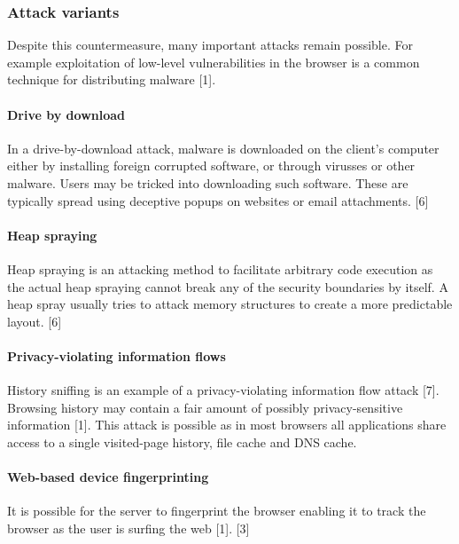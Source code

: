 \subsubsection{Attack variants}

Despite this countermeasure, many important attacks remain possible. For example exploitation of low-level vulnerabilities in the browser is a common technique for distributing malware [1].


\paragraph{Drive by download}

In a drive-by-download attack, malware is downloaded on the client's computer either by installing foreign corrupted software, or through virusses or other malware. Users may be tricked into downloading such software. These are typically spread using deceptive popups on websites or email attachments. [6]


\paragraph{Heap spraying}

Heap spraying is an attacking method to facilitate arbitrary code execution as the actual heap spraying cannot break any of the security boundaries by itself. A heap spray usually tries to attack memory structures to create a more predictable layout. [6]


\paragraph{Privacy-violating information flows}

History sniffing is an example of a privacy-violating information flow attack [7]. Browsing history may contain a fair amount of possibly privacy-sensitive information [1]. This attack is possible as in most browsers all applications share access to a single visited-page history, file cache and DNS cache.


\paragraph{Web-based device fingerprinting}

It is possible for the server to fingerprint the browser enabling it to track the browser as the user is surfing the web [1]. [3]



